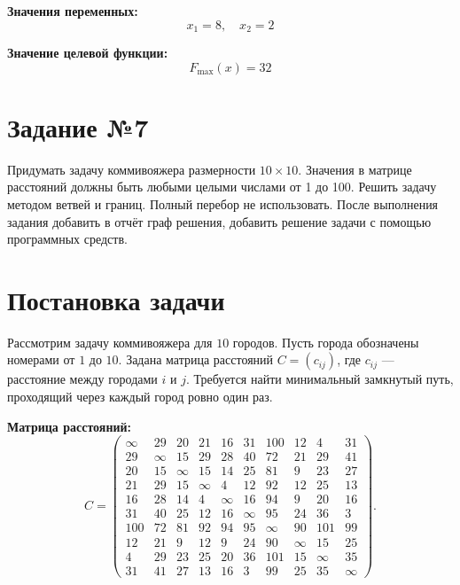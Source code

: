 \documentclass{article}
\begin{document}
\textbf{Значения переменных:}
\[
    x_1 = 8, \quad x_2 = 2
\]

\textbf{Значение целевой функции:}
\[
    F_{\max}(x) = 32
\]

\section{Задание №7}

Придумать задачу коммивояжера размерности $10 \times 10$. Значения в матрице расстояний должны быть любыми целыми числами от 1 до 100.
Решить задачу методом ветвей и границ. Полный перебор не использовать.
После выполнения задания добавить в отчёт граф решения, добавить решение задачи с помощью программных средств.

\section*{Постановка задачи}

Рассмотрим задачу коммивояжера для $10$ городов. Пусть города обозначены номерами от $1$ до $10$. Задана матрица расстояний $C = (c_{ij})$, где $c_{ij}$ — расстояние между городами $i$ и $j$. Требуется найти минимальный замкнутый путь, проходящий через каждый город ровно один раз.

\textbf{Матрица расстояний:}
\[
    C = \begin{pmatrix}
        \infty & 29     & 20     & 21     & 16     & 31     & 100    & 12     & 4      & 31     \\
        29     & \infty & 15     & 29     & 28     & 40     & 72     & 21     & 29     & 41     \\
        20     & 15     & \infty & 15     & 14     & 25     & 81     & 9      & 23     & 27     \\
        21     & 29     & 15     & \infty & 4      & 12     & 92     & 12     & 25     & 13     \\
        16     & 28     & 14     & 4      & \infty & 16     & 94     & 9      & 20     & 16     \\
        31     & 40     & 25     & 12     & 16     & \infty & 95     & 24     & 36     & 3      \\
        100    & 72     & 81     & 92     & 94     & 95     & \infty & 90     & 101    & 99     \\
        12     & 21     & 9      & 12     & 9      & 24     & 90     & \infty & 15     & 25     \\
        4      & 29     & 23     & 25     & 20     & 36     & 101    & 15     & \infty & 35     \\
        31     & 41     & 27     & 13     & 16     & 3      & 99     & 25     & 35     & \infty
    \end{pmatrix}.
\]
\end{document}

